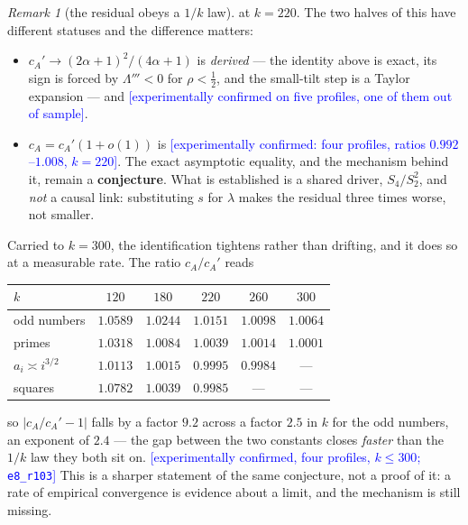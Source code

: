 \documentclass[11pt,a4paper]{article}
\theoremstyle{plain}
\theoremstyle{definition}
\theoremstyle{remark}
\newtheorem{remark}[theorem]{Remark}
\newcommand{\STATUS}[1]{\textcolor{blue}{\textsf{[#1]}}}
\begin{document}
\begin{remark}[the residual obeys a $1/k$ law]
\noindent
at $k=220$. The two halves of this have different statuses and the difference matters:

\begin{itemize}
\item $c_A'\to(2\alpha+1)^{2}/(4\alpha+1)$ is \emph{derived} --- the identity above is exact,
      its sign is forced by $\Lambda'''<0$ for $\rho<\tfrac12$, and the small-tilt step is a
      Taylor expansion --- and \STATUS{experimentally confirmed on five profiles, one of them
      out of sample}.
\item $c_A=c_A'(1+o(1))$ is \STATUS{experimentally confirmed: four profiles, ratios
      $0.992$--$1.008$, $k=220$}. The exact asymptotic equality, and the mechanism behind it,
      remain a \textbf{conjecture}. What is established is a shared driver, $S_4/S_2^{2}$, and
      \emph{not} a causal link: substituting $s$ for $\lambda$ makes the residual three times
      worse, not smaller.
\end{itemize}

\noindent
Carried to $k=300$, the identification tightens rather than drifting, and it does so at a
measurable rate. The ratio $c_A/c_A'$ reads

\begin{center}
\begin{tabular}{lccccc}
\toprule
$k$ & $120$ & $180$ & $220$ & $260$ & $300$\\
\midrule
odd numbers & $1.0589$ & $1.0244$ & $1.0151$ & $1.0098$ & $1.0064$\\
primes      & $1.0318$ & $1.0084$ & $1.0039$ & $1.0014$ & $1.0001$\\
$a_i\asymp i^{3/2}$ & $1.0113$ & $1.0015$ & $0.9995$ & $0.9984$ & ---\\
squares     & $1.0782$ & $1.0039$ & $0.9985$ & --- & ---\\
\bottomrule
\end{tabular}
\end{center}

\noindent
so $|c_A/c_A'-1|$ falls by a factor $9.2$ across a factor $2.5$ in $k$ for the odd numbers, an
exponent of $2.4$ --- the gap between the two constants closes \emph{faster} than the $1/k$
law they both sit on. \STATUS{experimentally confirmed, four profiles, $k\le300$;
\texttt{e8\_r103}} This is a sharper statement of the same conjecture, not a proof of it: a
rate of empirical convergence is evidence about a limit, and the mechanism is still missing.
\end{remark}
\end{document}

